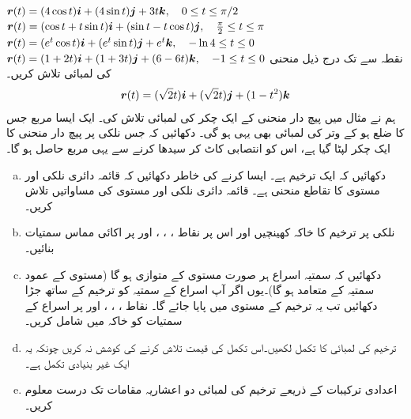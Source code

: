 ${{\boldsymbol{r}}}(t)=(4\cos t){\boldsymbol{i}}+(4\sin t){\boldsymbol{j}}+3t{\boldsymbol{k}},\quad 0\le t\le \pi/2$
${{\boldsymbol{r}}}(t)=(\cos t+t\sin t){\boldsymbol{i}}+(\sin t-t\cos t){\boldsymbol{j}},\quad \tfrac{\pi}{2}\le t\le \pi$
${{\boldsymbol{r}}}(t)=(e^t\cos t){\boldsymbol{i}}+(e^t\sin t){\boldsymbol{j}}+e^t{\boldsymbol{k}},\quad -\ln 4\le t\le 0$
${{\boldsymbol{r}}}(t)=(1+2t){\boldsymbol{i}}+(1+3t){\boldsymbol{j}}+(6-6t){\boldsymbol{k}},\quad -1\le t\le 0$
نقطہ   سے  تک درج  ذیل منحنی کی لمبائی تلاش کریں۔
\begin{align*}
{\ensuremath{{\boldsymbol{r}}}}(t)=(\sqrt{2}t){\boldsymbol{i}}+(\sqrt{2}t){\boldsymbol{j}}+(1-t^2){\boldsymbol{k}}
\end{align*}
ہم نے مثال  میں پیچ دار منحنی کے ایک چکر کی لمبائی  تلاش کی۔ ایک  ایسا مربع جس  کا  ضلع  ہو  کے وتر کی لمبائی بھی یہی ہو گی۔ دکھائیں کہ جس نلکی پر پیچ دار منحنی کا ایک چکر  لپٹا   گیا ہے، اس کو انتصابی کاٹ کر سیدھا کرنے سے یہی مربع حاصل ہو گا۔
\begin{enumerate}[a.]
\item
دکھائیں کہ   ایک ترخیم ہے۔  ایسا کرنے کی خاطر دکھائیں کہ     قائمہ دائری نلکی اور   مستوی کا تقاطع منحنی    ہے۔  قائمہ دائری نلکی اور مستوی  کی مساواتیں تلاش کریں۔
\item
نلکی پر ترخیم کا خاکہ کھینچیں اور اس پر     نقاط ، ، ،  اور  پر  اکائی مماس سمتیات بنائیں۔ 
\item
دکھائیں کہ سمتیہ اسراع ہر صورت مستوی کے متوازی ہو گا (مستوی کے عمود سمتیہ کے  متعامد ہو گا)۔یوں اگر  آپ اسراع کے سمتیہ  کو ترخیم کے ساتھ جڑا دکھائیں تب یہ ترخیم کے مستوی میں پایا جائے گا۔ نقاط ، ،  ، اور  پر اسراع   کے سمتیات کو خاکہ میں شامل کریں۔
\item
ترخیم کی لمبائی کا تکمل لکھیں۔اس تکمل کی قیمت تلاش کرنے کی کوشش نہ کریں چونکہ یہ ایک غیر بنیادی تکمل ہے۔
\item
اعدادی ترکیبات کے ذریعے  ترخیم کی لمبائی دو  اعشاریہ مقامات تک درست  معلوم کریں۔
\end{enumerate}

